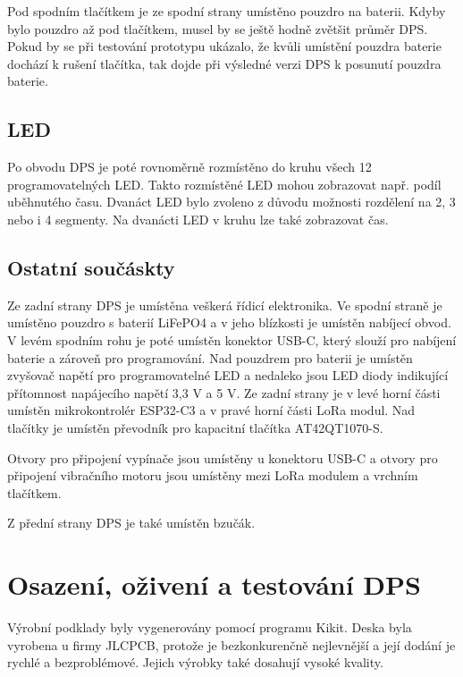 Pod spodním tlačítkem je ze spodní strany umístěno pouzdro na baterii. Kdyby bylo pouzdro až pod tlačítkem, musel by se ještě hodně zvětšit průměr DPS. Pokud by se při testování 
prototypu ukázalo, že kvůli umístění pouzdra baterie dochází k rušení tlačítka, tak dojde při výsledné verzi DPS k posunutí pouzdra baterie. 

\section{LED}
Po obvodu DPS je poté rovnoměrně rozmístěno do kruhu všech 12 programovatelných LED. Takto rozmístěné LED mohou zobrazovat např. podíl uběhnutého času. Dvanáct LED bylo zvoleno 
z důvodu možnosti rozdělení na 2, 3 nebo i 4 segmenty. Na dvanácti LED v kruhu lze také zobrazovat čas.

\section{Ostatní součáskty}
Ze zadní strany DPS je umístěna veškerá řídicí elektronika. Ve spodní straně je umístěno pouzdro s baterií LiFePO4 a v jeho blízkosti je umístěn nabíjecí obvod. V levém 
spodním rohu je poté umístěn konektor USB-C, který slouží pro nabíjení baterie a zároveň pro programování. Nad pouzdrem pro baterii je umístěn zvyšovač napětí pro programovatelné 
LED a nedaleko jsou LED diody indikující přítomnost napájecího napětí 3,3 V a 5 V. Ze zadní strany je v levé horní části umístěn mikrokontrolér ESP32-C3 a v pravé horní části 
LoRa modul. Nad tlačítky je umístěn převodník pro kapacitní tlačítka AT42QT1070-S.

Otvory pro připojení vypínače jsou umístěny u konektoru USB-C a otvory pro připojení vibračního motoru jsou umístěny mezi LoRa modulem a vrchním tlačítkem. 

Z přední strany DPS je také umístěn bzučák. 

\chapter{Osazení, oživení a testování DPS}
Výrobní podklady byly vygenerovány pomocí programu Kikit. Deska byla vyrobena u firmy JLCPCB, protože je bezkonkurenčně nejlevnější a její dodání je rychlé a bezproblémové. 
Jejich výrobky také dosahují vysoké kvality. 

